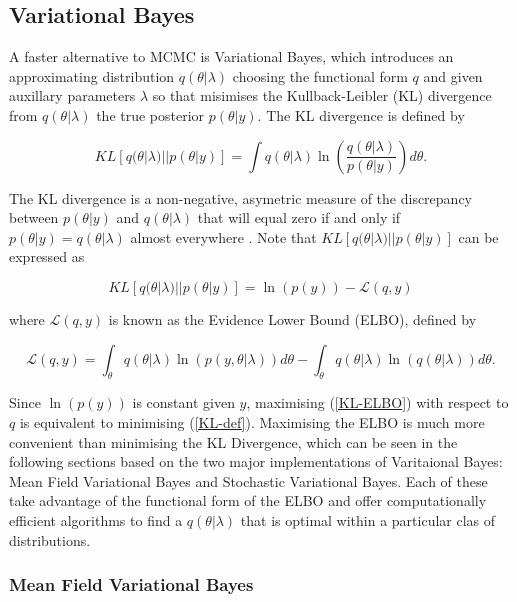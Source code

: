 \documentclass[12pt,a4paper]{article}%
\numberwithin{equation}{section}
\begin{document}
\subsection{Variational Bayes}

A faster alternative to MCMC is Variational Bayes, which introduces an approximating distribution $q(\theta | \lambda)$ choosing the functional form $q$ and given auxillary parameters $\lambda$ so that  misimises the Kullback-Leibler (KL) divergence \citep{Kullback1951} from $q(\theta | \lambda)$ the true posterior $p(\theta | y)$. The KL divergence is defined by

\begin{equation}
\label{KL-def}
KL[q(\theta | \lambda)||p(\theta | y)] = \int q(\theta | \lambda) \ln \left( \frac{q(\theta | \lambda)}{p(\theta | y)}\right) d\theta.
\end{equation}

The KL divergence is a non-negative, asymetric measure of the discrepancy between $p(\theta | y)$ and $q(\theta | \lambda)$ that will equal zero if and only if $p(\theta | y) = q(\theta | \lambda)$ almost everywhere \citep{Bishop2006}. Note that $KL[q(\theta | \lambda)||p(\theta | y)]$ can be expressed as

\begin{equation}
\label{KL-ELBO}
KL[q(\theta | \lambda)||p(\theta | y)] = \ln(p(y)) - \mathcal{L}(q, y)
\end{equation}

where $\mathcal{L}(q, y)$ is known as the Evidence Lower Bound (ELBO), defined by

\begin{equation}
\label{ELBO}
\mathcal{L}(q, y) = \int_{\theta} q(\theta|\lambda) \ln (p(y, \theta|\lambda)) d\theta -  \int_{\theta} q(\theta|\lambda) \ln (q(\theta|\lambda)) d\theta.
\end{equation}

Since $\ln(p(y))$ is constant given $y$, maximising (\ref{KL-ELBO}) with respect to $q$ is equivalent to minimising (\ref{KL-def}). Maximising the ELBO is much more convenient than minimising the KL Divergence, which can be seen in the following sections based on the two major implementations of Varitaional Bayes: Mean Field Variational Bayes and Stochastic Variational Bayes. Each of these take advantage of the functional form of the ELBO and offer computationally efficient algorithms to find a $q(\theta | \lambda)$ that is optimal within a particular clas of distributions. 

\subsubsection{Mean Field Variational Bayes} 
\end{document}
